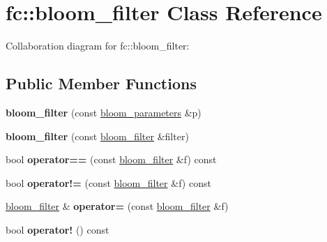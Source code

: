 \hypertarget{classfc_1_1bloom__filter}{}\section{fc\+:\+:bloom\+\_\+filter Class Reference}
\label{classfc_1_1bloom__filter}


Collaboration diagram for fc\+:\+:bloom\+\_\+filter\+:
\subsection*{Public Member Functions}
\begin{DoxyCompactItemize}
\item 
\mbox{\label{classfc_1_1bloom__filter_abfb929dc1b4099975cbd770e94df393b}} 
{\bfseries bloom\+\_\+filter} (const \mbox{\hyperlink{classfc_1_1bloom__parameters}{bloom\+\_\+parameters}} \&p)
\item 
\mbox{\label{classfc_1_1bloom__filter_a2a3dc854d9e13ba0959b88bbbc4a95f5}} 
{\bfseries bloom\+\_\+filter} (const \mbox{\hyperlink{classfc_1_1bloom__filter}{bloom\+\_\+filter}} \&filter)
\item 
\mbox{\label{classfc_1_1bloom__filter_a84ebbb3010a0ec2bfba07738deb7990b}} 
bool {\bfseries operator==} (const \mbox{\hyperlink{classfc_1_1bloom__filter}{bloom\+\_\+filter}} \&f) const
\item 
\mbox{\label{classfc_1_1bloom__filter_ae8f909c2a5c07dfeb84438dfbacbadd5}} 
bool {\bfseries operator!=} (const \mbox{\hyperlink{classfc_1_1bloom__filter}{bloom\+\_\+filter}} \&f) const
\item 
\mbox{\label{classfc_1_1bloom__filter_aaa5d5b00255f6b03da2f46d49524eeda}} 
\mbox{\hyperlink{classfc_1_1bloom__filter}{bloom\+\_\+filter}} \& {\bfseries operator=} (const \mbox{\hyperlink{classfc_1_1bloom__filter}{bloom\+\_\+filter}} \&f)
\item 
\mbox{\label{classfc_1_1bloom__filter_a948856dcae6bdd746147a2e7ffa6e09b}} 
bool {\bfseries operator!} () const
\item 
\mbox{\label{classfc_1_1bloom__filter_a4ec7826f181bf204946cec0ef2b27842}} 

\end{DoxyCompactItemize}
